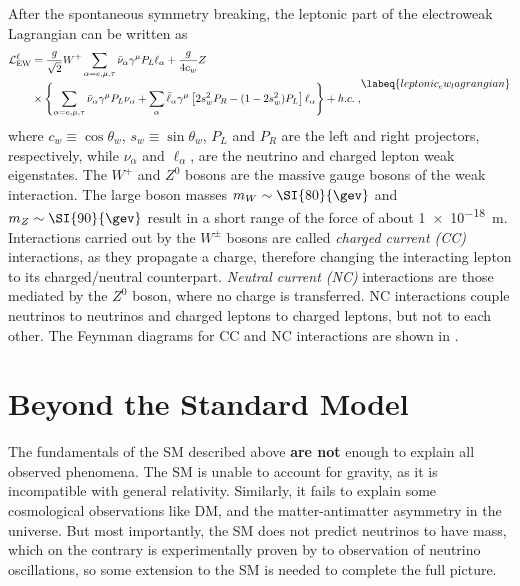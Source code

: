 After the spontaneous symmetry breaking, the leptonic part of the electroweak Lagrangian can be written as
\begin{equation}
    \begin{aligned}
        \mathcal{L}^{\ell}_{\rm EW} &= \frac{g}{\sqrt{2}}W^+ \sum _{\alpha=e,\mu,\tau} {\bar{\nu}}_{\alpha}\gamma ^\mu P_L \ell _\alpha + \frac{g}{4c_w} Z \\& \times \left\{ \sum _{\alpha=e,\mu,\tau} {\bar{\nu}}_{\alpha}\gamma ^\mu P_L \nu_{\alpha} + \sum _\alpha {\bar{\ell }}_\alpha \gamma ^\mu \left[ 2s_w^2P_R-(1-2s_w^2)P_L \right] \ell _\alpha \right\} + h.c.
        \;,
    \end{aligned}
    \labeq{leptonic_ew_lagrangian}
\end{equation}
where $c_w \equiv \cos \theta _w$, $s_w \equiv \sin \theta _w$, $P_L$ and $P_R$ are the left and right projectors, respectively, while $\nu_{\alpha}$ and $\ell _\alpha$, are the neutrino and charged lepton weak eigenstates. The $W^+$ and $Z^0$ bosons are the massive gauge bosons of the weak interaction. The large boson masses $m_{{W}}\sim\SI{80}{\gev}$ and $m_{{Z}}\sim\SI{90}{\gev}$ result in a short range of the force of about \SI{1e-18}{\meter}. Interactions carried out by the ${W}^\pm$ bosons are called \textit{charged current (CC)} interactions, as they propagate a charge, therefore changing the interacting lepton to its charged/neutral counterpart. \textit{Neutral current (NC)} interactions are those mediated by the ${Z}^0$ boson, where no charge is transferred. NC interactions couple neutrinos to neutrinos and charged leptons to charged leptons, but not to each other. The Feynman diagrams for CC and NC interactions are shown in .


\section{Beyond the Standard Model}

The fundamentals of the SM described above \textbf{are not} enough to explain all observed phenomena. The SM is unable to account for gravity, as it is incompatible with general relativity. Similarly, it fails to explain some cosmological observations like DM, and the matter-antimatter asymmetry in the universe. But most importantly, the SM does not predict neutrinos to have mass, which on the contrary is experimentally proven by to observation of neutrino oscillations, so some extension to the SM is needed to complete the full picture.

